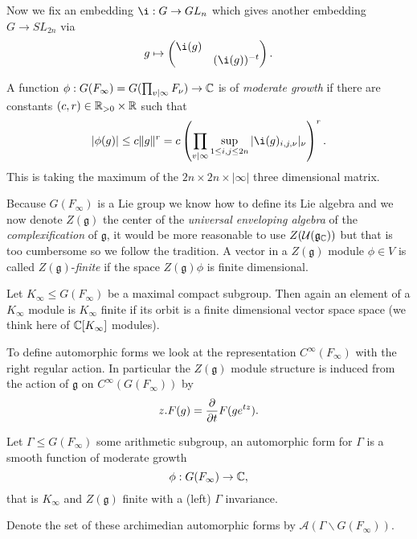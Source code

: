 Now we fix an embedding \(\i : G\to GL_n\) which gives another embedding \(G\to SL_{2n}\) via
	\[g\mapsto \begin{pmatrix}
		\i (g) & \\
		 & (\i (g))^{-t}
	\end{pmatrix}.\]

	A function \(\phi : G(F_\infty) = G(\prod_{v|\infty} F_\nu) \to \C \) is of \textit{moderate growth} if there are constants \((c,r)\in \R_{>0}\times \R\) such that 
	\[|\phi(g)| \leq c\norm{g}^r = c \left(\prod_{v|\infty} \sup_{1\leq i, j\leq 2n} |\i (g)_{i,j, \nu}|_\nu\right)^r.\]
	This is taking the maximum of the \(2n\times 2n \times |\infty| \) three dimensional matrix. 

    Because \(G(F_\infty)\) is a Lie group we know how to define its Lie algebra and we now denote \(Z(\mathfrak{g})\) the center of the \textit{universal enveloping algebra} of the \textit{complexification} of \(\mathfrak{g}\), it would be more reasonable to use \(Z(\mathcal{U}(\mathfrak{g}_{\C}))\) but that is too cumbersome so we follow the tradition. 
    A vector in a \(Z(\mathfrak{g})\) module \(\phi\in V\) is called \(Z(\mathfrak{g})\)-\textit{finite} if the space \(Z(\mathfrak{g})\phi\) is finite dimensional. 

	Let \(K_\infty\leq G(F_\infty)\) be a maximal compact subgroup. Then again an element of a \(K_\infty\) module is \(K_\infty\) finite if its orbit is a finite dimensional vector space space (we think here of \(\C[K_\infty]\) modules).

	To define automorphic forms we look at the representation \(C^\infty(F_\infty)\) with the right regular action.  In particular the \(Z(\mathfrak{g})\) module structure is induced from the action of \(\mathfrak{g}\) on \(C^\infty(G(F_\infty))\) by \label{lie_algebra_action}
	\[z.F(g) = \frac{\partial }{\partial t}F(ge^{tz}).\] 

	\begin{Definition}
		Let \(\Gamma\leq G(F_\infty)\) some arithmetic subgroup, an automorphic form for \(\Gamma\) is a smooth function of moderate growth 
		\[\phi: G(F_\infty) \to \C,\]
		that is \(K_\infty\) and \(Z(\mathfrak{g})\) finite with a (left) \(\Gamma\) invariance. 

		Denote the set of these archimedian automorphic forms by \(\mathcal{A}(\Gamma \backslash G(F_\infty))\).

	\end{Definition}


